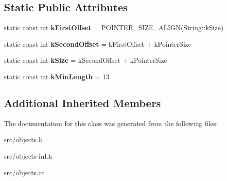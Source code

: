 \subsection*{Static Public Attributes}
\begin{DoxyCompactItemize}
\item 
\hypertarget{classv8_1_1internal_1_1_cons_string_a95a124eb7efeaba961e787defc3646ee}{}static const int {\bfseries k\+First\+Offset} = P\+O\+I\+N\+T\+E\+R\+\_\+\+S\+I\+Z\+E\+\_\+\+A\+L\+I\+G\+N(String\+::k\+Size)\label{classv8_1_1internal_1_1_cons_string_a95a124eb7efeaba961e787defc3646ee}

\item 
\hypertarget{classv8_1_1internal_1_1_cons_string_ad54aec7d731f2c13af79a6a57774370f}{}static const int {\bfseries k\+Second\+Offset} = k\+First\+Offset + k\+Pointer\+Size\label{classv8_1_1internal_1_1_cons_string_ad54aec7d731f2c13af79a6a57774370f}

\item 
\hypertarget{classv8_1_1internal_1_1_cons_string_a998544a7ba1a51c4803544dc17cb7882}{}static const int {\bfseries k\+Size} = k\+Second\+Offset + k\+Pointer\+Size\label{classv8_1_1internal_1_1_cons_string_a998544a7ba1a51c4803544dc17cb7882}

\item 
\hypertarget{classv8_1_1internal_1_1_cons_string_aa2d9a5efa6f974193d3b56fdc2d33044}{}static const int {\bfseries k\+Min\+Length} = 13\label{classv8_1_1internal_1_1_cons_string_aa2d9a5efa6f974193d3b56fdc2d33044}

\end{DoxyCompactItemize}
\subsection*{Additional Inherited Members}


The documentation for this class was generated from the following files\+:\begin{DoxyCompactItemize}
\item 
src/objects.\+h\item 
src/objects-\/inl.\+h\item 
src/objects.\+cc\end{DoxyCompactItemize}
